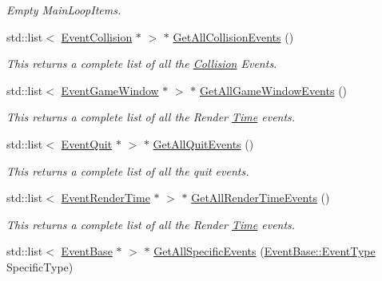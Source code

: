 \begin{DoxyCompactItemize}
\begin{DoxyCompactList}\small\item\em Empty MainLoopItems. \item\end{DoxyCompactList}\item 
std::list$<$ \hyperlink{classMezzanine_1_1EventCollision}{EventCollision} $\ast$ $>$ $\ast$ \hyperlink{classMezzanine_1_1EventManager_ab630dfe228b7a4246680953cdfbbfc0a}{GetAllCollisionEvents} ()
\begin{DoxyCompactList}\small\item\em This returns a complete list of all the \hyperlink{classMezzanine_1_1Collision}{Collision} Events. \item\end{DoxyCompactList}\item 
std::list$<$ \hyperlink{classMezzanine_1_1EventGameWindow}{EventGameWindow} $\ast$ $>$ $\ast$ \hyperlink{classMezzanine_1_1EventManager_abd6f4de517d07ab7a1a0c330c4e29032}{GetAllGameWindowEvents} ()
\begin{DoxyCompactList}\small\item\em This returns a complete list of all the Render \hyperlink{structMezzanine_1_1Time}{Time} events. \item\end{DoxyCompactList}\item 
std::list$<$ \hyperlink{classMezzanine_1_1EventQuit}{EventQuit} $\ast$ $>$ $\ast$ \hyperlink{classMezzanine_1_1EventManager_ae54b0f6e266c738ceb2b5192d2412a38}{GetAllQuitEvents} ()
\begin{DoxyCompactList}\small\item\em This returns a complete list of all the quit events. \item\end{DoxyCompactList}\item 
std::list$<$ \hyperlink{classMezzanine_1_1EventRenderTime}{EventRenderTime} $\ast$ $>$ $\ast$ \hyperlink{classMezzanine_1_1EventManager_a671df48c725e661274f21751ab2ec2f9}{GetAllRenderTimeEvents} ()
\begin{DoxyCompactList}\small\item\em This returns a complete list of all the Render \hyperlink{structMezzanine_1_1Time}{Time} events. \item\end{DoxyCompactList}\item 
std::list$<$ \hyperlink{classMezzanine_1_1EventBase}{EventBase} $\ast$ $>$ $\ast$ \hyperlink{classMezzanine_1_1EventManager_af149e3c8893bdd214d4c1d6aea5388b2}{GetAllSpecificEvents} (\hyperlink{classMezzanine_1_1EventBase_ab85e31e97753b7e7ecb098f82526baef}{EventBase::EventType} SpecificType)

\end{DoxyCompactItemize}
